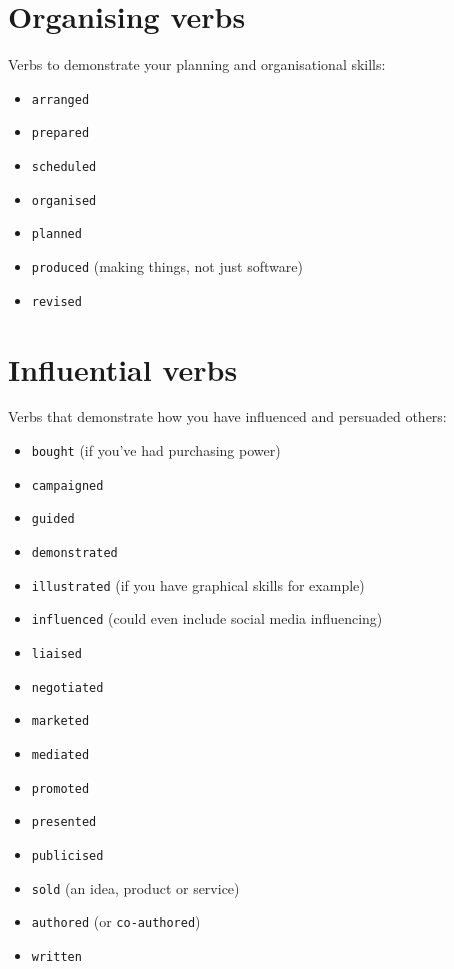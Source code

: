 \documentclass[
]{book}
\providecommand{\tightlist}{%
  \setlength{\itemsep}{0pt}\setlength{\parskip}{0pt}}
\begin{document}
\hypertarget{planning}{%
\section{Organising verbs}\label{planning}}

Verbs to demonstrate your planning and organisational skills:

\begin{itemize}
\tightlist
\item
  \texttt{arranged}
\item
  \texttt{prepared}
\item
  \texttt{scheduled}
\item
  \texttt{organised}
\item
  \texttt{planned}
\item
  \texttt{produced} (making things, not just software)
\item
  \texttt{revised}
\end{itemize}

\hypertarget{influencing}{%
\section{Influential verbs}\label{influencing}}

Verbs that demonstrate how you have influenced and persuaded others:

\begin{itemize}
\tightlist
\item
  \texttt{bought} (if you've had purchasing power)
\item
  \texttt{campaigned}
\item
  \texttt{guided}
\item
  \texttt{demonstrated}
\item
  \texttt{illustrated} (if you have graphical skills for example)
\item
  \texttt{influenced} (could even include social media influencing)
\item
  \texttt{liaised}
\item
  \texttt{negotiated}
\item
  \texttt{marketed}
\item
  \texttt{mediated}
\item
  \texttt{promoted}
\item
  \texttt{presented}
\item
  \texttt{publicised}
\item
  \texttt{sold} (an idea, product or service)
\item
  \texttt{authored} (or \texttt{co-authored})
\item
  \texttt{written}
\end{itemize}
\end{document}
